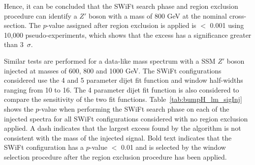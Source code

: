Hence, it can be concluded that the SWiFt search phase and region exclusion procedure can identify
a $Z'$ boson with a mass of 800 GeV at the nominal cross-section.
The \bh{} $p$-value assigned after region exclusion is applied is $<$ 0.001 using 10,000 pseudo-experiments,
which shows that the excess has a significance greater than 3~$\sigma$.

\FloatBarrier

Similar tests are performed for a data-like mass spectrum
with a SSM $Z'$ boson injected at masses of 600, 800 and 1000 GeV.
The SWiFt configurations considered use the 4 and 5 parameter dijet fit function and window half-widths ranging from 10 to 16.
The 4 parameter dijet fit function is also considered to compare the sensitivity of the two fit functions.
Table~\ref{tab:bumpH_lm_sigInj} shows the \bh{} \mbox{$p$-value} 
when performing the SWiFt search phase on each of the injected spectra
for all SWiFt configurations considered with no region exclusion applied.
A dash indicates that the largest excess found by the \bh{} algorithm is not consistent with the mass of the injected signal.
Bold text indicates that the SWiFt configuration has a \bh{} $p$-value $<$ 0.01
and is selected by the window selection procedure after the region exclusion procedure has been applied.


